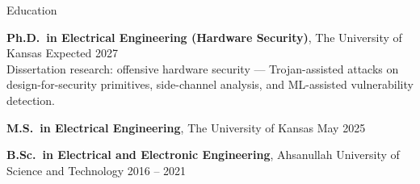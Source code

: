 \begin{rSection}{Education}

{\bf Ph.D.\ in Electrical Engineering (Hardware Security)}, The University of Kansas \hfill {Expected 2027}\\
Dissertation research: offensive hardware security --- Trojan-assisted attacks on design-for-security primitives, side-channel analysis, and ML-assisted vulnerability detection.

{\bf M.S.\ in Electrical Engineering}, The University of Kansas \hfill {May 2025}

{\bf B.Sc.\ in Electrical and Electronic Engineering}, Ahsanullah University of Science and Technology \hfill {2016 -- 2021}

\end{rSection}
